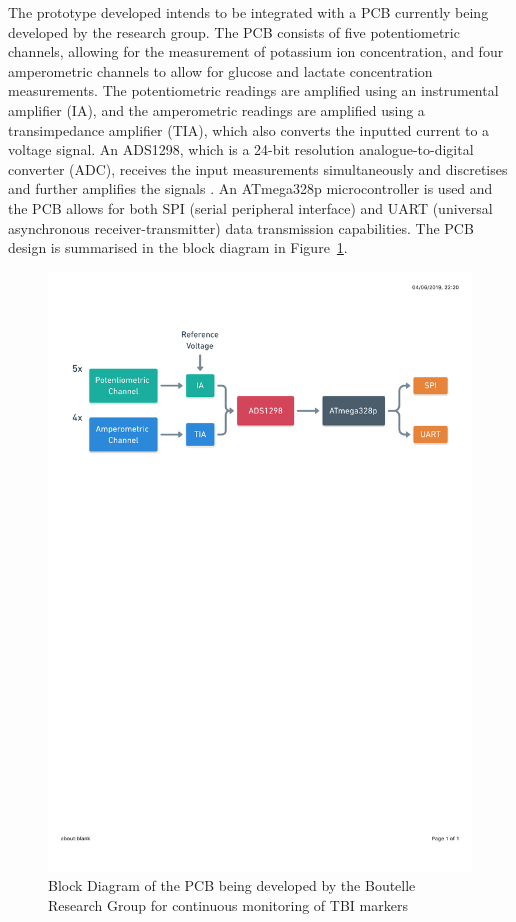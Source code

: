 The prototype developed intends to be integrated with a PCB currently being developed by the research group. The PCB consists of five potentiometric channels, allowing for the measurement of potassium ion concentration, and four amperometric channels to allow for glucose and lactate concentration measurements. The potentiometric readings are amplified using an instrumental amplifier (IA), and the amperometric readings are amplified using a transimpedance amplifier (TIA), which also converts the inputted current to a voltage signal. An ADS1298, which is a 24-bit resolution analogue-to-digital converter (ADC), receives the input measurements simultaneously and discretises and further amplifies the signals \cite{TexasInstruments2010}. An ATmega328p microcontroller is used and the PCB allows for both SPI (serial peripheral interface) and UART (universal asynchronous receiver-transmitter) data transmission capabilities. The PCB design is summarised in the block diagram in Figure~\ref{fig: PCB block diagram}.

\begin{figure}[h!]
\centering
\includegraphics[trim={0cm 20.5cm 0.5cm  2.9cm}, clip, width=1\textwidth]{./figures/CircuitBlockDiagram.pdf}
\captionsetup{justification=centering}
\caption{Block Diagram of the PCB being developed by the Boutelle Research Group for continuous monitoring of TBI markers}
\label{fig: PCB block diagram}
\end{figure}


